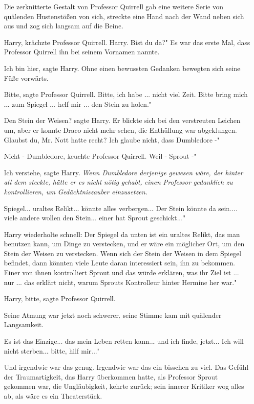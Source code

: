 Die zerknitterte Gestalt von Professor Quirrell gab eine weitere Serie von
quälenden Hustenstößen von sich, streckte eine Hand nach der Wand neben sich aus
und zog sich langsam auf die Beine.

\glqq Harry\grqq{}, krächzte Professor Quirrell. \glqq Harry. Bist du da?" Es
war das erste Mal, dass Professor Quirrell ihn bei seinem Vornamen nannte.

\glqq Ich bin hier\grqq{}, sagte Harry. Ohne einen bewussten Gedanken bewegten
sich seine Füße vorwärts.

\glqq Bitte\grqq{}, sagte Professor Quirrell. \glqq Bitte, ich habe ... nicht
viel Zeit. Bitte bring mich ... zum Spiegel ... helf mir ... den Stein zu
holen."

\glqq Den Stein der Weisen?\grqq{} sagte Harry. Er blickte sich bei den
verstreuten Leichen um, aber er konnte Draco nicht mehr sehen, die Enthüllung
war abgeklungen. \glqq Glaubst du, Mr. Nott hatte recht? Ich glaube nicht, dass
Dumbledore -"

\glqq Nicht - Dumbledore\grqq{}, keuchte Professor Quirrell. \glqq Weil - Sprout
-"

\glqq Ich verstehe\grqq{}, sagte Harry.
\emph{Wenn Dumbledore derjenige gewesen wäre, der hinter all dem steckte, hätte er es nicht nötig gehabt, einen Professor gedanklich zu kontrollieren, um Gedächtniszauber einzusetzen.}

\glqq Spiegel... uraltes Relikt... könnte alles verbergen... Der Stein könnte da
sein.... viele andere wollen den Stein... einer hat Sprout geschickt..."

Harry wiederholte schnell: \glqq Der Spiegel da unten ist ein uraltes Relikt,
das man benutzen kann, um Dinge zu verstecken, und er wäre ein möglicher Ort, um
den Stein der Weisen zu verstecken. Wenn sich der Stein der Weisen in dem
Spiegel befindet, dann könnten viele Leute daran interessiert sein, ihn zu
bekommen. Einer von ihnen kontrolliert Sprout und das würde erklären, was ihr
Ziel ist ... nur ... das erklärt nicht, warum Sprouts Kontrolleur hinter Hermine
her war."

\glqq Harry, bitte\grqq{}, sagte Professor Quirrell.

Seine Atmung war jetzt noch schwerer, seine Stimme kam mit quälender
Langsamkeit.

\glqq Es ist das Einzige... das mein Leben retten kann... und ich finde,
jetzt... Ich will nicht sterben... bitte, hilf mir..."

Und irgendwie war das genug. Irgendwie war das ein bisschen zu viel. Das Gefühl
der Traumartigkeit, das Harry überkommen hatte, als Professor Sprout gekommen
war, die Ungläubigkeit, kehrte zurück; sein innerer Kritiker wog alles ab, als
wäre es ein Theaterstück.

